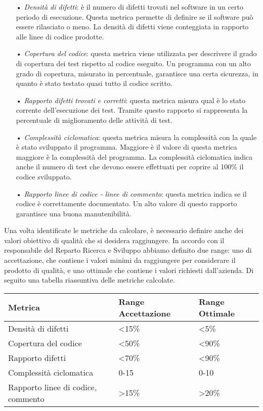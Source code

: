 \begin{itemize}
\item[•] \textit{Densità di difetti}: è il numero di difetti trovati nel software in un certo periodo di esecuzione. Questa metrica permette di definire se il software può essere rilasciato o meno. La densità di difetti viene conteggiata in rapporto alle linee di codice prodotte. 

\item[•] \textit{Copertura del codice}: questa metrica viene utilizzata per descrivere il grado di copertura dei test rispetto al codice eseguito. Un programma con un alto grado di copertura, misurato in percentuale, garantisce una certa sicurezza, in quanto è stato testato quasi tutto il codice scritto. 

\item[•] \textit{Rapporto difetti trovati e corretti}: questa metrica misura qual è lo stato corrente dell'esecuzione dei test. Tramite questo rapporto si rappresenta la percentuale di miglioramento delle attività di test.

\item[•] \textit{Complessità ciclomatica}: questa metrica misura la complessità con la quale è stato sviluppato il programma. Maggiore è il valore di questa metrica maggiore è la complessità del programma. La complessità ciclomatica indica anche il numero di test che devono essere effettuati per coprire al 100\% il codice sviluppato.

\item[•] \textit{Rapporto linee di codice - linee di commento}: questa metrica indica se il codice è correttamente documentato. Un alto valore di questo rapporto garantisce una buona manutenibilità.
\end{itemize}


Una volta identificate le metriche da calcolare, è necessario definire anche dei valori obiettivo di qualità che si desidera raggiungere. In accordo con il responsabile del Reparto Ricerca e Sviluppo abbiamo definito due range: uno di accettazione, che contiene i valori minimi da raggiungere per considerare il prodotto di qualità, e uno ottimale che contiene i valori richiesti dall'azienda. Di seguito una tabella riassuntiva delle metriche calcolate.
\bigskip

\begin{tabular}{|l l l|}
\hline
Metrica	& Range Accettazione	& Range Ottimale \\
\hline
Densità di difetti & <15\% & <5\% \\
Copertura del codice & <50\% & <90\% \\
Rapporto difetti & <70\% & <90\% \\
Complessità ciclomatica & 0-15 & 0-10 \\
Rapporto linee di codice, commento  & >15\% & >20\% \\
\hline
\end{tabular}

